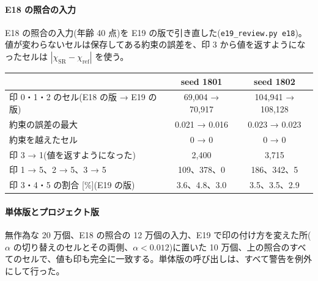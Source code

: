 \paragraph{E18 の照合の入力}
E18 の照合の入力(年齢 40 点)を E19 の版で引き直した(\texttt{e19\_review.py e18})。値が変わらないセルは保存してある約束の誤差を、印 3 から値を返すようになったセルは $|\chi_\mathrm{SR}-\chi_\mathrm{ref}|$ を使う。
\begin{center}\small
\begin{tabular}{lcc}
\toprule
 & seed 1801 & seed 1802\\
\midrule
印 0・1・2 のセル(E18 の版 → E19 の版) & 69{,}004 → 70{,}917 & 104{,}941 → 108{,}128\\
約束の誤差の最大 & 0.021 → 0.016 & 0.023 → 0.023\\
約束を越えたセル & 0 → 0 & 0 → 0\\
印 3 → 1(値を返すようになった) & 2{,}400 & 3{,}715\\
印 1 → 5、2 → 5、3 → 5 & 109、378、0 & 186、342、5\\
印 3・4・5 の割合 [\%](E19 の版) & 3.6、4.8、3.0 & 3.5、3.5、2.9\\
\bottomrule
\end{tabular}
\end{center}

\paragraph{単体版とプロジェクト版}
無作為な 20 万個、E18 の照合の 12 万個の入力、E19 で印の付け方を変えた所($\alpha$ の切り替えのセルとその両側、$\alpha<0.012$)に置いた 10 万個、上の照合のすべてのセルで、値も印も完全に一致する。単体版の呼び出しは、すべて警告を例外にして行った。

